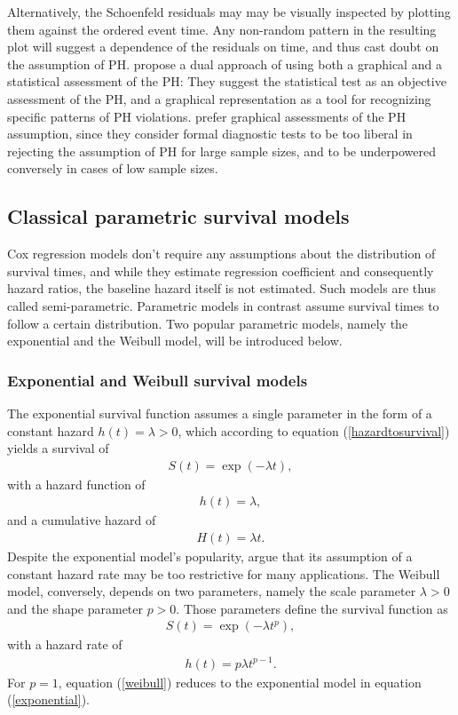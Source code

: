 \documentclass[main.tex]{subfiles}
\begin{document}
Alternatively, the Schoenfeld residuals may may be visually inspected by plotting them against the ordered event time. Any non-random pattern in the resulting plot will suggest a dependence of the residuals on time, and thus cast doubt on the assumption of PH.
\textcite{kleinbaum2012survival} propose a dual approach of using both a graphical and a statistical assessment of the PH: They suggest the statistical test as an objective assessment of the PH, and a graphical representation as a tool for recognizing specific patterns of PH violations. \textcite{klein2003survival} prefer graphical assessments of the PH assumption, since they consider formal diagnostic tests to be too liberal in rejecting the assumption of PH for large sample sizes, and to be underpowered conversely in cases of low sample sizes.

\subsection{Classical parametric survival models}
Cox regression models don't require any assumptions about the distribution of survival times, and while they estimate regression coefficient and consequently hazard ratios, the baseline hazard itself is not estimated. Such models are thus called semi-parametric. Parametric models in contrast assume survival times to follow a certain distribution. Two popular parametric models, namely the exponential and the Weibull model, will be introduced below.
\subsubsection{Exponential and Weibull survival models}
The exponential survival function assumes a single parameter in the form of a constant hazard $h(t) = \lambda>0$, which according to equation (\ref{hazardtosurvival}) yields a survival of 
\begin{align}\label{exponential}
S(t)= \exp{(-\lambda t)},
\end{align}
with a hazard function of
\begin{align}
h(t)= \lambda,
\end{align}
and a cumulative hazard of
\begin{align}
H(t)= \lambda t.
\end{align}
Despite the exponential model's popularity, \textcite{klein2003survival} argue that its assumption of a constant hazard rate may be too restrictive for many applications. The Weibull model, conversely, depends on two parameters, namely the scale parameter $\lambda>0$ and the shape parameter $p>0$. Those parameters define the survival function as
\begin{align}\label{weibull}
S(t)= \exp{(-\lambda t^p)},
\end{align}
with a hazard rate of
\begin{align}
h(t)= p\lambda t^{p-1}.
\end{align}
For $p=1$, equation (\ref{weibull}) reduces to the exponential model in equation (\ref{exponential}).
\end{document}
